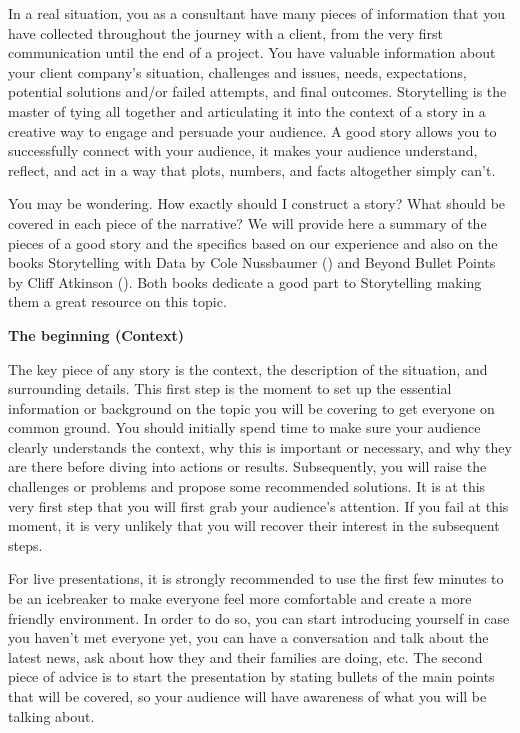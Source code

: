 \documentclass[
]{krantz}
\begin{document}
In a real situation, you as a consultant have many pieces of information that you have collected throughout the journey with a client, from the very first communication until the end of a project. You have valuable information about your client company's situation, challenges and issues, needs, expectations, potential solutions and/or failed attempts, and final outcomes. Storytelling is the master of tying all together and articulating it into the context of a story in a creative way to engage and persuade your audience. A good story allows you to successfully connect with your audience, it makes your audience understand, reflect, and act in a way that plots, numbers, and facts altogether simply can't.

You may be wondering. How exactly should I construct a story? What should be covered in each piece of the narrative? We will provide here a summary of the pieces of a good story and the specifics based on our experience and also on the books Storytelling with Data by Cole Nussbaumer (\citet{Knaflic2015}) and Beyond Bullet Points by Cliff Atkinson (\citet{Cliff2018}). Both books dedicate a good part to Storytelling making them a great resource on this topic.

\textbf{The beginning (Context)}

The key piece of any story is the context, the description of the situation, and surrounding details. This first step is the moment to set up the essential information or background on the topic you will be covering to get everyone on common ground. You should initially spend time to make sure your audience clearly understands the context, why this is important or necessary, and why they are there before diving into actions or results. Subsequently, you will raise the challenges or problems and propose some recommended solutions. It is at this very first step that you will first grab your audience's attention. If you fail at this moment, it is very unlikely that you will recover their interest in the subsequent steps.

For live presentations, it is strongly recommended to use the first few minutes to be an icebreaker to make everyone feel more comfortable and create a more friendly environment. In order to do so, you can start introducing yourself in case you haven't met everyone yet, you can have a conversation and talk about the latest news, ask about how they and their families are doing, etc. The second piece of advice is to start the presentation by stating bullets of the main points that will be covered, so your audience will have awareness of what you will be talking about.
\end{document}
